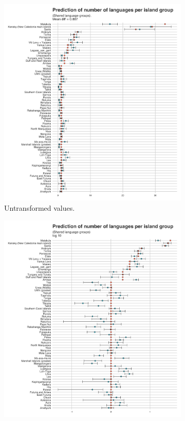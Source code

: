 \documentclass[a4paper,10pt]{article} %
\begin{document}
    \begin{figure}
\centering
    \begin{subfigure}{12cm}
\centering
\includegraphics[width=\textwidth]{illustrations/plots_from_R/medium_group_model_prediction.png}
\caption{Untransformed values.}
    \end{subfigure}
\hfil
    \begin{subfigure}{12cm}
\centering
\includegraphics[width=\textwidth]{illustrations/plots_from_R/medium_group_model_prediction_log10.png}

\end{subfigure}
\end{figure}
\end{document}
